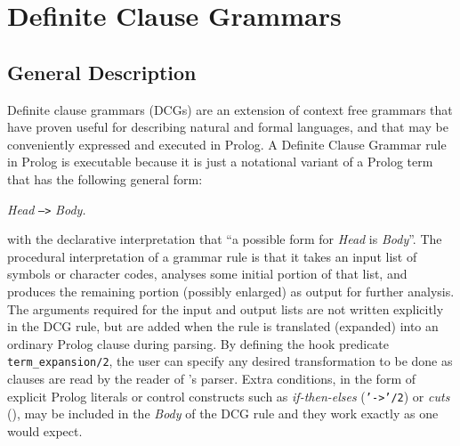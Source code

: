 \chapter{Definite Clause Grammars} \label{DCGs}


\section{General Description}
Definite clause grammars (DCGs) are an extension of context free grammars
that have proven useful for describing natural and formal languages, and that
may be conveniently expressed and executed in Prolog. 
A Definite Clause Grammar rule in Prolog is executable because it is just 
a notational variant of a Prolog term that has the following general form:
\begin{center}
                {\em Head} {\tt -->} {\em Body.}
\end{center}
with the declarative interpretation that ``a possible form for {\em Head} is 
{\em Body}''. The procedural interpretation of a grammar rule is that it
takes an input list of symbols or character codes, analyses some initial
portion of that list, and produces the remaining portion (possibly enlarged)
as output for further analysis. The arguments required for the input and
output lists are not written explicitly in the DCG rule, but are added
when the rule is translated (expanded) into an ordinary Prolog clause during
parsing.  By defining the hook predicate {\tt term\_expansion/2}, the user
can specify any desired transformation to be done as clauses are read by the
reader of \ourprolog's parser.
Extra conditions, in the form of explicit Prolog literals or control
constructs such as {\em if-then-elses} ({\tt '->'/2}) or {\em cuts} 
(\cut), may be included in the {\em Body} of the DCG rule 
and they work exactly as one would expect.


